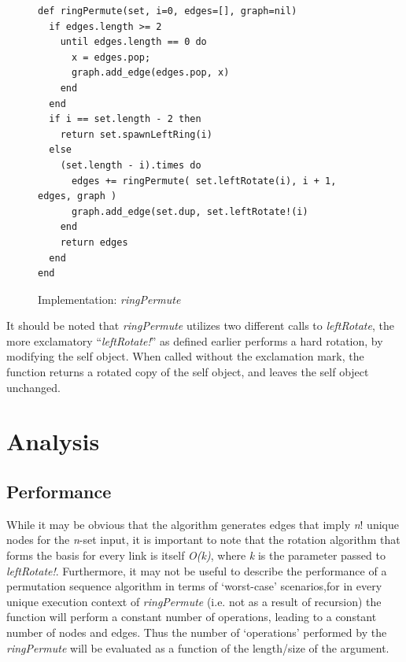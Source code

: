 \documentclass[12pt]{article}
\begin{document}
\newpage
\begin{figure}[h]
\centering
\singlespacing
\begin{verbatim}
def ringPermute(set, i=0, edges=[], graph=nil)
  if edges.length >= 2
    until edges.length == 0 do
      x = edges.pop;
      graph.add_edge(edges.pop, x)
    end
  end
  if i == set.length - 2 then
    return set.spawnLeftRing(i)
  else
    (set.length - i).times do
      edges += ringPermute( set.leftRotate(i), i + 1, edges, graph )
      graph.add_edge(set.dup, set.leftRotate!(i)
    end
    return edges
  end
end
\end{verbatim}
\caption{Implementation: \emph{ringPermute}}
\label{ringPermute}
\end{figure}

It should be noted that \emph{ringPermute} utilizes two different calls to \emph{leftRotate}, the more exclamatory ``\emph{leftRotate!}'' as defined earlier performs a hard rotation, by modifying the self object.
When called without the exclamation mark, the function returns a rotated copy of the self object, and leaves the self object unchanged.\\

\newpage
\section{Analysis}
\setlength{\parindent}{1cm}

\subsection{Performance}
While it may be obvious that the algorithm generates edges that imply \emph{n}! unique nodes for the \emph{n}-set input, it is important \linebreak to note that the rotation algorithm that forms the basis for every link is itself \emph{O(k)}, where \emph{k} is the parameter passed to \emph{leftRotate!}.
Furthermore, it may not be useful to describe the performance of a permutation sequence algorithm in terms of `worst-case' scenarios,\linebreak for in every unique execution context of \emph{ringPermute} (i.e\@. not as a result of recursion) the function will perform a constant number of operations, leading to a constant number of nodes and edges.
Thus the number of `operations' performed by the \emph{ringPermute} will be evaluated as a function of the length/size of the argument.\\
\end{document}
